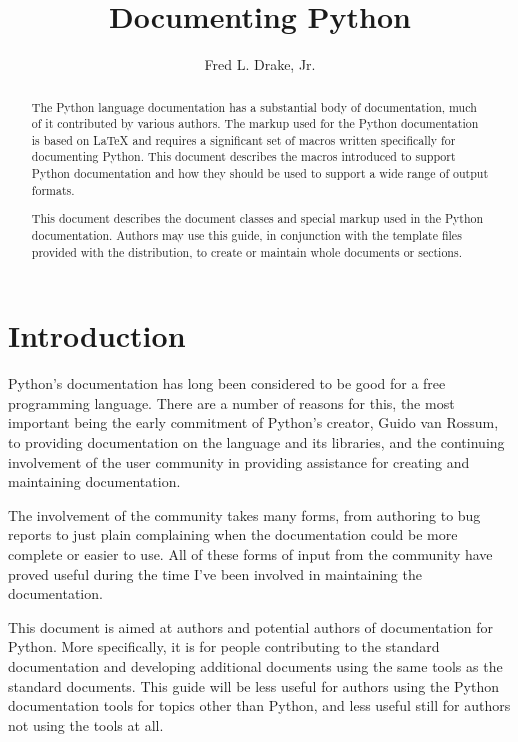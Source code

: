 \documentclass{howto}
\title{Documenting Python}
\author{Fred L. Drake, Jr.}
\begin{document}
\maketitle

\begin{abstract}
\noindent
The Python language documentation has a substantial body of
documentation, much of it contributed by various authors.  The markup
used for the Python documentation is based on \LaTeX{} and requires a
significant set of macros written specifically for documenting Python.
This document describes the macros introduced to support Python
documentation and how they should be used to support a wide range of
output formats.

This document describes the document classes and special markup used
in the Python documentation.  Authors may use this guide, in
conjunction with the template files provided with the
distribution, to create or maintain whole documents or sections.
\end{abstract}

\tableofcontents


\section{Introduction}

  Python's documentation has long been considered to be good for a
  free programming language.  There are a number of reasons for this,
  the most important being the early commitment of Python's creator,
  Guido van Rossum, to providing documentation on the language and its
  libraries, and the continuing involvement of the user community in
  providing assistance for creating and maintaining documentation.

  The involvement of the community takes many forms, from authoring to
  bug reports to just plain complaining when the documentation could
  be more complete or easier to use.  All of these forms of input from
  the community have proved useful during the time I've been involved
  in maintaining the documentation.

  This document is aimed at authors and potential authors of
  documentation for Python.  More specifically, it is for people
  contributing to the standard documentation and developing additional
  documents using the same tools as the standard documents.  This
  guide will be less useful for authors using the Python documentation
  tools for topics other than Python, and less useful still for
  authors not using the tools at all.
\end{document}
